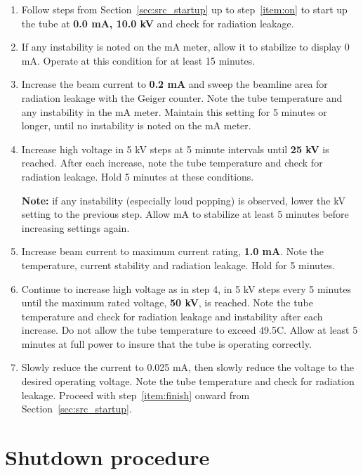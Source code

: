 \begin{enumerate}

\item Follow steps from Section~\ref{sec:src_startup} up to step~\ref{item:on} to start up the tube at \textbf{0.0 mA, 10.0 kV} and check for radiation leakage.

\item If any instability is noted on the mA meter, allow it to stabilize to display 0 mA. Operate at this condition for at least 15 minutes.

\item Increase the beam current to \textbf{0.2 mA} and sweep the beamline area for radiation leakage with the Geiger counter. Note the tube temperature and any instability in the mA meter. Maintain this setting for 5 minutes or longer, until no instability is noted on the mA meter.

\item Increase high voltage in 5 kV steps at 5 minute intervals until \textbf{25 kV} is reached. After each increase, note the tube temperature and check for radiation leakage. Hold 5 minutes at these conditions.

\textbf{Note:} if any instability (especially loud popping) is observed, lower the kV setting to the previous step. Allow mA to stabilize at least 5 minutes before increasing settings again.

\item Increase beam current to maximum current rating, \textbf{1.0 mA}. Note the temperature, current stability and radiation leakage. Hold for 5 minutes.

\item Continue to increase high voltage as in step 4, in 5 kV steps every 5 minutes until the maximum rated voltage, \textbf{50 kV}, is reached. Note the tube temperature and check for radiation leakage and instability after each increase. Do not allow the tube temperature to exceed 49.5C. Allow at least 5 minutes at full power to insure that the tube is operating correctly.

\item Slowly reduce the current to 0.025 mA, then slowly reduce the voltage to the desired operating voltage. Note the tube temperature and check for radiation leakage. Proceed with step~\ref{item:finish} onward from Section~\ref{sec:src_startup}.


\end{enumerate}

\section{Shutdown procedure\label{sec:shutdown}}

